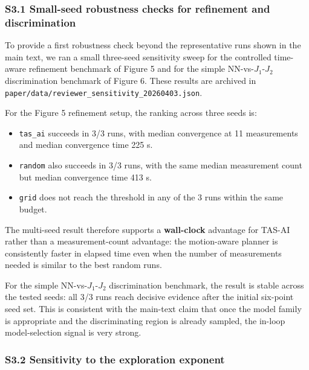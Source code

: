 \documentclass[
]{article}
\providecommand{\tightlist}{%
  \setlength{\itemsep}{0pt}\setlength{\parskip}{0pt}}
\begin{document}
\hypertarget{s3.1-small-seed-robustness-checks-for-refinement-and-discrimination}{%
\subsubsection{S3.1 Small-seed robustness checks for refinement and
discrimination}\label{s3.1-small-seed-robustness-checks-for-refinement-and-discrimination}}

To provide a first robustness check beyond the representative runs shown
in the main text, we ran a small three-seed sensitivity sweep for the
controlled time-aware refinement benchmark of Figure 5 and for the
simple NN-vs-\(J_1\)-\(J_2\) discrimination benchmark of Figure 6. These
results are archived in
\texttt{paper/data/reviewer\_sensitivity\_20260403.json}.

For the Figure 5 refinement setup, the ranking across three seeds is:

\begin{itemize}
\tightlist
\item
  \texttt{tas\_ai} succeeds in 3/3 runs, with median convergence at 11
  measurements and median convergence time 225 s.
\item
  \texttt{random} also succeeds in 3/3 runs, with the same median
  measurement count but median convergence time 413 s.
\item
  \texttt{grid} does not reach the threshold in any of the 3 runs within
  the same budget.
\end{itemize}

The multi-seed result therefore supports a \textbf{wall-clock} advantage
for TAS-AI rather than a measurement-count advantage: the motion-aware
planner is consistently faster in elapsed time even when the number of
measurements needed is similar to the best random runs.

For the simple NN-vs-\(J_1\)-\(J_2\) discrimination benchmark, the
result is stable across the tested seeds: all 3/3 runs reach decisive
evidence after the initial six-point seed set. This is consistent with
the main-text claim that once the model family is appropriate and the
discriminating region is already sampled, the in-loop model-selection
signal is very strong.

\hypertarget{s3.2-sensitivity-to-the-exploration-exponent}{%
\subsubsection{S3.2 Sensitivity to the exploration
exponent}\label{s3.2-sensitivity-to-the-exploration-exponent}}
\end{document}
